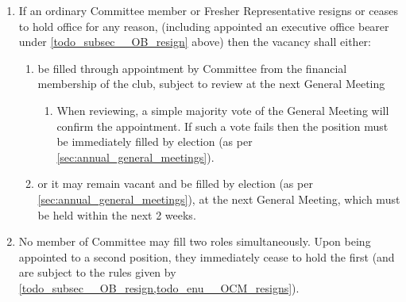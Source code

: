 \documentclass[a4paper]{article}
\begin{document}
\begin{enumerate}
    \item \label{todo_enu__OCM_resigns} If an ordinary Committee member or Fresher Representative resigns or ceases to hold office for any reason, (including appointed an executive office bearer under \cref{todo_subsec__OB_resign} above) then the vacancy shall either:
          \begin{enumerate}
              \item be filled through appointment by Committee from the financial membership of the club, subject to review at the next General Meeting
                    \begin{enumerate}
                        \item When reviewing, a simple majority vote of the General Meeting will confirm the appointment. If such a vote fails then the position must be immediately filled by election (as per \cref{sec:annual_general_meetings}).
                    \end{enumerate}
              \item or it may remain vacant and be filled by election (as per \cref{sec:annual_general_meetings}), at the next General Meeting, which must be held within the next 2 weeks.
          \end{enumerate}
    \item No member of Committee may fill two roles simultaneously. Upon being appointed to a second position, they immediately cease to hold the first (and are subject to the rules given by \cref{todo_subsec__OB_resign,todo_enu__OCM_resigns}).
\end{enumerate}
\end{document}
